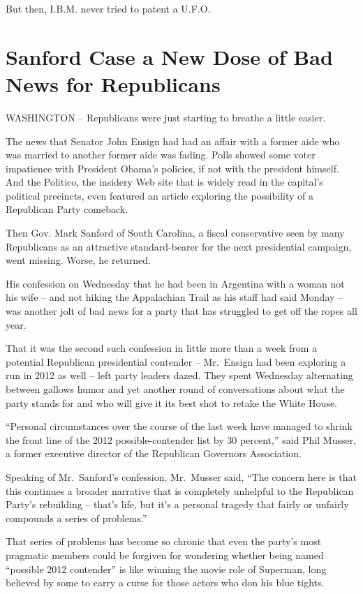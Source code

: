 ﻿\documentclass[12pt]{article}
\begin{document}
But then, I.B.M. never tried to patent a U.F.O.

\section{Sanford Case a New Dose of Bad News for Republicans}

WASHINGTON -- Republicans were just starting to breathe a little easier.

The news that Senator John Ensign had had an affair with a former aide who was married to another
former aide was fading. Polls showed some voter impatience with President Obama's policies, if not
with the president himself. And the Politico, the insidery Web site that is widely read in the
capital's political precincts, even featured an article exploring the possibility of a Republican
Party comeback.

Then Gov. Mark Sanford of South Carolina, a fiscal conservative seen by many Republicans as an
attractive standard-bearer for the next presidential campaign, went missing. Worse, he returned.

His confession on Wednesday that he had been in Argentina with a woman not his wife -- and not
hiking the Appalachian Trail as his staff had said Monday -- was another jolt of bad news for a
party that has struggled to get off the ropes all year.

That it was the second such confession in little more than a week from a potential Republican
presidential contender -- Mr.~Ensign had been exploring a run in 2012 as well -- left party leaders
dazed. They spent Wednesday alternating between gallows humor and yet another round of conversations
about what the party stands for and who will give it its best shot to retake the White House.

``Personal circumstances over the course of the last week have managed to shrink the front line of
the 2012 possible-contender list by 30 percent,'' said Phil Musser, a former executive director of
the Republican Governors Association.

Speaking of Mr.~Sanford's confession, Mr.~Musser said, ``The concern here is that this continues a
broader narrative that is completely unhelpful to the Republican Party's rebuilding -- that's life,
but it's a personal tragedy that fairly or unfairly compounds a series of problems.''

That series of problems has become so chronic that even the party's most pragmatic members could be
forgiven for wondering whether being named ``possible 2012 contender'' is like winning the movie
role of Superman, long believed by some to carry a curse for those actors who don his blue tights.
\end{document}
